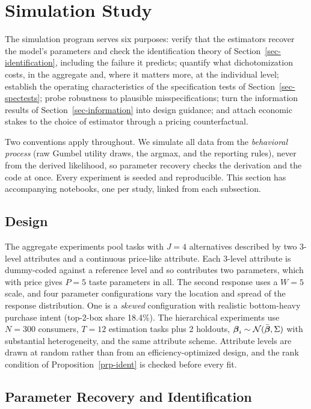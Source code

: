 \documentclass[
  letterpaper,
  DIV=11,
  numbers=noendperiod]{scrartcl}
\theoremstyle{plain}
\theoremstyle{plain}
\theoremstyle{plain}
\theoremstyle{remark}
\begin{document}
\section{Simulation Study}\label{sec-simstudy}

The simulation program serves six purposes: verify that the estimators
recover the model's parameters and check the identification theory of
Section~\ref{sec-identification}, including the failure it predicts;
quantify what dichotomization costs, in the aggregate and, where it
matters more, at the individual level; establish the operating
characteristics of the specification tests of
Section~\ref{sec-spectests}; probe robustness to plausible
misspecifications; turn the information results of
Section~\ref{sec-information} into design guidance; and attach economic
stakes to the choice of estimator through a pricing counterfactual.

Two conventions apply throughout. We simulate all data from the
\emph{behavioral process} (raw Gumbel utility draws, the argmax, and the
reporting rules), never from the derived likelihood, so parameter
recovery checks the derivation and the code at once. Every experiment is
seeded and reproducible. This section has accompanying notebooks, one
per study, linked from each subsection.

\subsection{Design}\label{sec-simdesign}

The aggregate experiments pool tasks with \(J = 4\) alternatives
described by two 3-level attributes and a continuous price-like
attribute. Each 3-level attribute is dummy-coded against a reference
level and so contributes two parameters, which with price gives
\(P = 5\) taste parameters in all. The second response uses a \(W = 5\)
scale, and four parameter configurations vary the location and spread of
the response distribution. One is a \emph{skewed} configuration with
realistic bottom-heavy purchase intent (top-2-box share 18.4\%). The
hierarchical experiments use \(N = 300\) consumers, \(T = 12\)
estimation tasks plus 2 holdouts,
\(\boldsymbol{\beta}_i \sim \mathcal{N}(\bar{\boldsymbol{\beta}}, \Sigma)\) with substantial
heterogeneity, and the same attribute scheme. Attribute levels are drawn
at random rather than from an efficiency-optimized design, and the rank
condition of Proposition~\ref{prp-ident} is checked before every fit.

\subsection{Parameter Recovery and Identification}\label{sec-sim-agg}
\end{document}
